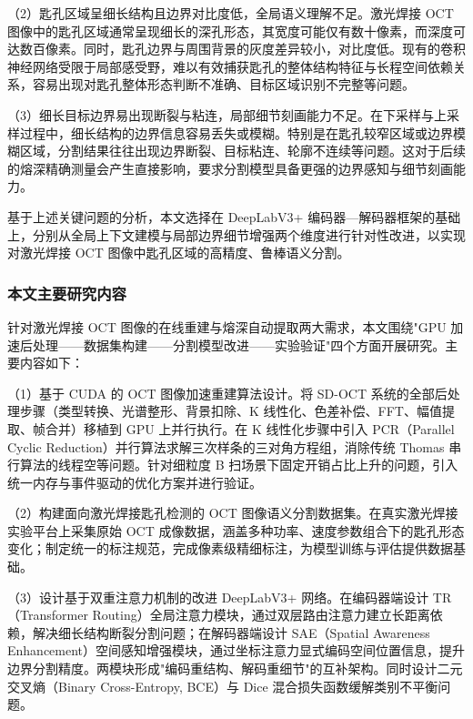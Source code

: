 （2）匙孔区域呈细长结构且边界对比度低，全局语义理解不足。激光焊接 OCT 图像中的匙孔区域通常呈现细长的深孔形态，其宽度可能仅有数十像素，而深度可达数百像素。同时，匙孔边界与周围背景的灰度差异较小，对比度低。现有的卷积神经网络受限于局部感受野，难以有效捕获匙孔的整体结构特征与长程空间依赖关系，容易出现对匙孔整体形态判断不准确、目标区域识别不完整等问题。

（3）细长目标边界易出现断裂与粘连，局部细节刻画能力不足。在下采样与上采样过程中，细长结构的边界信息容易丢失或模糊。特别是在匙孔较窄区域或边界模糊区域，分割结果往往出现边界断裂、目标粘连、轮廓不连续等问题。这对于后续的熔深精确测量会产生直接影响，要求分割模型具备更强的边界感知与细节刻画能力。

基于上述关键问题的分析，本文选择在 DeepLabV3+ 编码器—解码器框架的基础上，分别从全局上下文建模与局部边界细节增强两个维度进行针对性改进，以实现对激光焊接 OCT 图像中匙孔区域的高精度、鲁棒语义分割。

\subsubsection{本文主要研究内容}
针对激光焊接 OCT 图像的在线重建与熔深自动提取两大需求，本文围绕"GPU 加速后处理——数据集构建——分割模型改进——实验验证"四个方面开展研究。主要内容如下：

（1）基于 CUDA 的 OCT 图像加速重建算法设计。将 SD-OCT 系统的全部后处理步骤（类型转换、光谱整形、背景扣除、K 线性化、色差补偿、FFT、幅值提取、帧合并）移植到 GPU 上并行执行。在 K 线性化步骤中引入 PCR（Parallel Cyclic Reduction）并行算法求解三次样条的三对角方程组，消除传统 Thomas 串行算法的线程空等问题。针对细粒度 B 扫场景下固定开销占比上升的问题，引入统一内存与事件驱动的优化方案并进行验证。

（2）构建面向激光焊接匙孔检测的 OCT 图像语义分割数据集。在真实激光焊接实验平台上采集原始 OCT 成像数据，涵盖多种功率、速度参数组合下的匙孔形态变化；制定统一的标注规范，完成像素级精细标注，为模型训练与评估提供数据基础。

（3）设计基于双重注意力机制的改进 DeepLabV3+ 网络。在编码器端设计 TR（Transformer Routing）全局注意力模块，通过双层路由注意力建立长距离依赖，解决细长结构断裂分割问题；在解码器端设计 SAE（Spatial Awareness Enhancement）空间感知增强模块，通过坐标注意力显式编码空间位置信息，提升边界分割精度。两模块形成"编码重结构、解码重细节"的互补架构。同时设计二元交叉熵（Binary Cross-Entropy, BCE）与 Dice 混合损失函数缓解类别不平衡问题。

